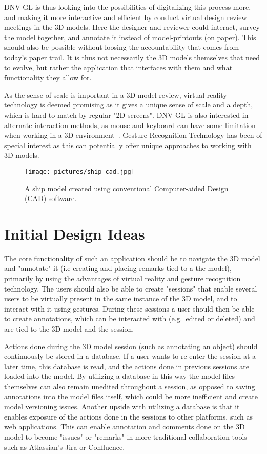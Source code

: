 DNV GL is thus looking into the possibilities of digitalizing this process more, and making it more interactive and efficient by 
conduct virtual design review meetings in the 3D models. Here the designer and reviewer could interact, 
survey the model together, and annotate it instead of model-printouts (on paper). This should also be possible 
without loosing the accountability that comes from today’s paper trail. It is thus not necessarily the 3D models themselves that 
need to evolve, but rather the application that interfaces with them and what functionality they allow for.  

As the sense of scale is important in a 3D model review, virtual reality technology is deemed promising as it gives a unique sense of scale
and a depth, which is hard to match by regular "2D screens". 
DNV GL is also interested in alternate interaction methods, as mouse and keyboard can have some limitation when working in a 3D environment~\citep{Rautaray2015}. 
Gesture Recognition Technology has been of special interest as this can potentially offer unique approaches to working with 3D models.

\begin{figure}%
	\texttt{[image: pictures/ship\_cad.jpg]}
	\caption[A ship model created using conventional CAD software.]{A ship model created using conventional Computer-aided Design (CAD) software.~\cite{IMO}}
	\label{fig:ship_cad}
\end{figure} 


\section{Initial Design Ideas}
The core functionality of such an application should be to navigate the 3D model and "annotate" it (i.e creating and placing remarks tied to a the model), 
primarily by using the advantages of virtual reality and gesture recognition technology. 
The users should also be able to create "sessions" that enable several users to be virtually present 
in the same instance of the 3D model, and to interact with it using gestures. During these sessions a user should then be able to create annotations, 
which can be interacted with (e.g.~edited or deleted) and are tied to the 3D model and the session. 

Actions done during the 3D model session (such as annotating an object) should continuously be stored in a database. 
If a user wants to re-enter the session at a later time, this database is read, and the actions done in previous sessions are loaded into the model.
By utilizing a database 
in this way the model files themselves can also remain unedited throughout a session, as opposed to saving annotations into the model files itself, 
which could be more inefficient and create model versioning issues. 
Another upside with utilizing a database is that it enables exposure of the actions done in the sessions to other platforms, such as web applications. 
This can enable annotation and comments done on the 3D model to become "issues" or "remarks" in more traditional collaboration tools such as Atlassian's Jira or Confluence.

